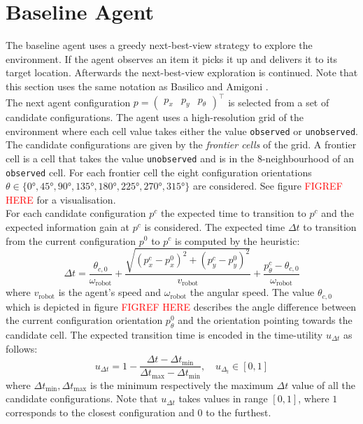 \section{Baseline Agent}\label{sec:baseline}
The baseline agent uses a greedy next-best-view strategy to explore the environment. If the agent observes an item it picks it up and delivers it to its target location. Afterwards the next-best-view exploration is continued. Note that this section uses the same notation as Basilico and Amigoni \cite{Basilico2011}.\\

The next agent configuration $p=\begin{pmatrix}p_x & p_y & p_\theta\end{pmatrix}^\intercal$ is selected from a set of candidate configurations. The agent uses a high-resolution grid of the environment where each cell value takes either the value \texttt{observed} or \texttt{unobserved}. The candidate configurations are given by the \textit{frontier cells} of the grid. A frontier cell is a cell that takes the value \texttt{unobserved} and is in the 8-neighbourhood of an \texttt{observed} cell. For each frontier cell the eight configuration orientations $\theta\in \{\ang{0}, \ang{45}, \ang{90}, \ang{135}, \ang{180}, \ang{225}, \ang{270}, \ang{315} \}$ are considered. See figure \textcolor{red}{FIGREF HERE} for a visualisation. \\

For each candidate configuration $p^c$ the expected time to transition to $p^c$ and the expected information gain at $p^c$ is considered. The expected time $\Delta t$ to transition from the current configuration $p^0$ to $p^c$ is computed by the heuristic:
%
\begin{equation}
    \Delta t = \frac{\theta_{c,0}}{\omega_\text{robot}} +    \frac{\sqrt{(p^c_x - p^0_x)^2 + (p^c_y - p^0_y)^2}}{v_\text{robot}} + \frac{p^c_\theta - \theta_{c,0}}{\omega_\text{robot}}
\end{equation}
%
where $v_\text{robot}$ is the agent's speed and $\omega_\text{robot}$ the angular speed. The value $\theta_{c,0}$ which is depicted in figure \textcolor{red}{FIGREF HERE} describes the angle difference between the current configuration orientation $p_\theta^0$ and the orientation pointing towards the candidate cell. The expected transition time is encoded in the time-utility $u_{\Delta t}$ as follows:
%
\begin{equation}
    u_{\Delta t} = 1 - \frac{\Delta t - \Delta t_{\text{min}}}{\Delta t_\text{max}-\Delta t_\text{min}}, \quad u_{\Delta_t}\in [0, 1]
\end{equation}
where $\Delta t_\text{min}, \Delta t_\text{max}$ is the minimum respectively the maximum $\Delta t$ value of all the candidate configurations. Note that $u_{\Delta t}$ takes values in range $[0, 1]$, where $1$ corresponds to the closest configuration and $0$ to the furthest.\\

